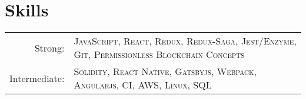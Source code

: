 \documentclass[a4paper,10pt]{article}
\begin{document}
\section{Skills}
\begin{tabular}{rl}
    Strong:& \textsc{JavaScript}, \textsc{React}, \textsc{Redux}, \textsc{Redux-Saga}, \textsc{Jest/Enzyme}, \textsc{Git}, \textsc{Permissionless Blockchain Concepts}\\
    Intermediate:& \textsc{Solidity}, \textsc{React Native}, \textsc{Gatsbyjs}, \textsc{Webpack}, \textsc{Angularjs}, \textsc{CI}, \textsc{AWS}, \textsc{Linux}, \textsc{SQL}\\
\end{tabular}
\end{document}

